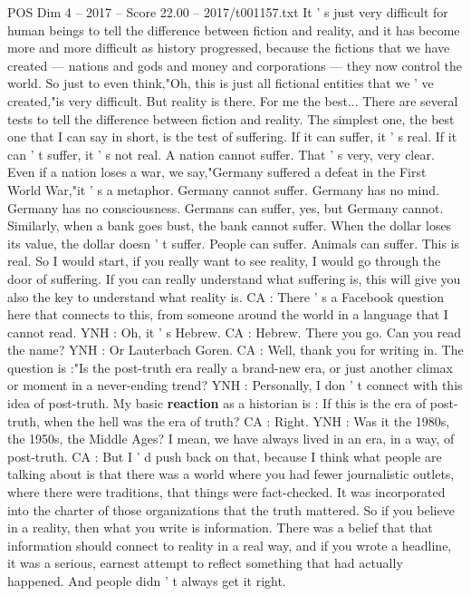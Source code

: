 \begin{textsample}{POS Dim 4 – 2017 – Score 22.00 – 2017/t001157.txt}
It ' s just very difficult for human beings to tell the difference between fiction and reality, and it has become more and more difficult as history progressed, because the fictions that we have created — nations and gods and money and corporations — they now control the world.
So just to even think,"Oh, this is just all fictional entities that we ' ve created,"is very difficult.
But reality is there.
For me the best...
There are several tests to tell the difference between fiction and reality.
The simplest one, the best one that I can say in short, is the test of suffering.
If it can suffer, it ' s real.
If it can ' t suffer, it ' s not real.
A nation cannot suffer.
That ' s very, very clear.
Even if a nation loses a war, we say,"Germany suffered a defeat in the First World War,"it ' s a metaphor.
Germany cannot suffer.
Germany has no mind.
Germany has no consciousness.
Germans can suffer, yes, but Germany cannot.
Similarly, when a bank goes bust, the bank cannot suffer.
When the dollar loses its value, the dollar doesn ' t suffer.
People can suffer.
Animals can suffer.
This is real.
So I would start, if you really want to see reality, I would go through the door of suffering.
If you can really understand what suffering is, this will give you also the key to understand what reality is.
CA : There ' s a Facebook question here that connects to this, from someone around the world in a language that I cannot read.
YNH : Oh, it ' s Hebrew.
CA : Hebrew.
There you go.
Can you read the name?
YNH : Or Lauterbach Goren.
CA : Well, thank you for writing in.
The question is :"Is the post-truth era really a brand-new era, or just another climax or moment in a never-ending trend?
YNH : Personally, I don ' t connect with this idea of post-truth.
My basic \textbf{reaction} as a historian is : If this is the era of post-truth, when the hell was the era of truth?
CA : Right.
YNH : Was it the 1980s, the 1950s, the Middle Ages?
I mean, we have always lived in an era, in a way, of post-truth.
CA : But I ' d push back on that, because I think what people are talking about is that there was a world where you had fewer journalistic outlets, where there were traditions, that things were fact-checked.
It was incorporated into the charter of those organizations that the truth mattered.
So if you believe in a reality, then what you write is information.
There was a belief that that information should connect to reality in a real way, and if you wrote a headline, it was a serious, earnest attempt to reflect something that had actually happened.
And people didn ' t always get it right.

\end{textsample}
